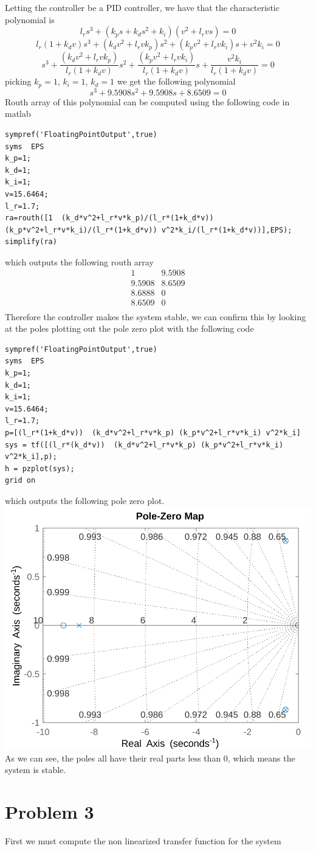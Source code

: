 \documentclass[12pt]{article}
\begin{document}
Letting the controller be a PID controller, we have that the characteristic polynomial is
$$l_r s^3+(k_ps+k_ds^2+k_i)(v^2+l_r v s)=0$$
$$l_r(1+k_d v)s^3+(k_dv^2+l_r v k_p)s^2+(k_pv^2+l_r v k_i)s+v^2k_i=0$$
$$s^3+\frac{(k_dv^2+l_r v k_p)}{l_r(1+k_d v)}s^2+\frac{(k_pv^2+l_r v k_i)}{l_r(1+k_d v)}s+\frac{v^2k_i}{l_r(1+k_d v)}=0$$
picking $k_p=1$, $k_i=1$, $k_d=1$ we get the following polynomial
$$s^3+9.5908s^2+9.5908s+8.6509=0$$
Routh array of this polynomial can be computed using the following code in matlab
\begin{verbatim}
sympref('FloatingPointOutput',true)
syms  EPS
k_p=1;
k_d=1;
k_i=1; 
v=15.6464;
l_r=1.7;
ra=routh([1  (k_d*v^2+l_r*v*k_p)/(l_r*(1+k_d*v)) (k_p*v^2+l_r*v*k_i)/(l_r*(1+k_d*v)) v^2*k_i/(l_r*(1+k_d*v))],EPS);
simplify(ra)
\end{verbatim}
which outputs the following routh array
$$\begin{matrix}
    1 & 9.5908\\
    9.5908& 8.6509\\
8.6888&      0\\
8.6509&      0\\
\end{matrix}$$
Therefore the controller makes the system stable, we can confirm this by looking at the poles
plotting out the pole zero plot with the following code 
\begin{verbatim}
sympref('FloatingPointOutput',true)
syms  EPS
k_p=1;
k_d=1;
k_i=1; 
v=15.6464;
l_r=1.7;
p=[(l_r*(1+k_d*v))  (k_d*v^2+l_r*v*k_p) (k_p*v^2+l_r*v*k_i) v^2*k_i]
sys = tf([(l_r*(k_d*v))  (k_d*v^2+l_r*v*k_p) (k_p*v^2+l_r*v*k_i) v^2*k_i],p);
h = pzplot(sys);
grid on
\end{verbatim}
which outputs the following pole zero plot.\\
\includegraphics[scale=0.4]{Problem2Fig1.png}\\
As we can see, the poles all have their real parts less than 0, which means the system is stable.
\section*{Problem 3}
First we must compute the non linearized transfer function for the system
\end{document}
